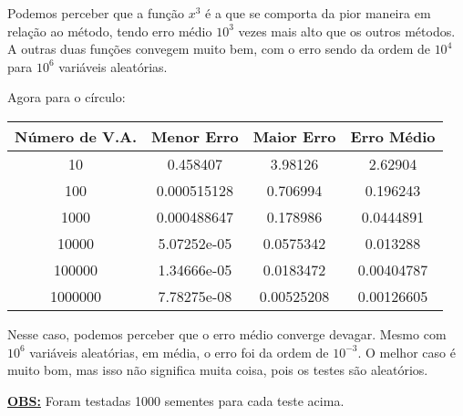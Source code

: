 \documentclass[12pt]{article}
\newcommand{\mytitle}[1]{\textbf{\underline{#1}}}
\begin{document}
Podemos perceber que a função $x^3$ é a que se comporta da pior maneira em relação ao método, tendo erro médio $10^3$ vezes mais alto que os outros métodos. A outras duas funções convegem muito bem, com o erro sendo da ordem de $10^4$ para $10^6$ variáveis aleatórias.

\newpage

Agora para o círculo:

\begin{center}
  \begin{tabular}{||c | c | c | c ||}
    \hline
    Número de V.A. & Menor Erro & Maior Erro & Erro Médio \\ [0.5ex]
    \hline\hline
    10 & 0.458407 & 3.98126 & 2.62904 \\
    \hline
    100 & 0.000515128 & 0.706994 & 0.196243 \\
    \hline
    1000 & 0.000488647 & 0.178986 & 0.0444891 \\
    \hline
    10000 & 5.07252e-05 & 0.0575342 & 0.013288 \\
    \hline
    100000 & 1.34666e-05 & 0.0183472 & 0.00404787 \\
    \hline
    1000000 & 7.78275e-08 & 0.00525208 & 0.00126605 \\
    \hline
  \end{tabular}
\end{center}

Nesse caso, podemos perceber que o erro médio converge devagar. Mesmo com $10^6$ variáveis aleatórias, em média, o erro foi da ordem de $10^{-3}$.
O melhor caso é muito bom, mas isso não significa muita coisa, pois os testes são aleatórios. 

\mytitle{OBS:} Foram testadas 1000 sementes para cada teste acima.
\end{document}
